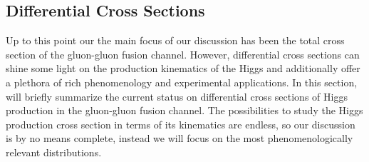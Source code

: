 \subsection{Differential Cross Sections}
Up to this point our the main focus of our discussion has been the total cross section of the gluon-gluon fusion channel. However, differential cross sections can shine some light on the production kinematics of the Higgs and additionally offer a plethora of rich phenomenology and experimental applications. In this section, will briefly summarize the current status on differential cross sections of Higgs production in the gluon-gluon fusion channel. The possibilities to study the Higgs production cross section in terms of its kinematics are endless, so our discussion is by no means complete, instead we will focus on the most phenomenologically relevant distributions.

